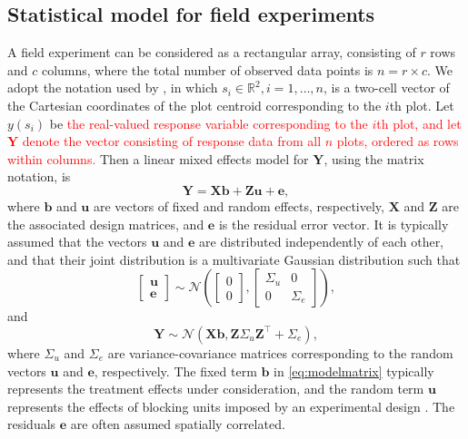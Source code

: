 \documentclass[a4paper]{article}   	%
\newcommand{\N}{\mathcal{N}}
\begin{document}
	\subsection{Statistical model for field experiments}\label{sec:fieldmodel}
	
	A field experiment can be considered as a rectangular array, consisting of $r$ rows and $c$ columns, where the total number of observed data points is $n= r\times c$. We adopt the notation used by \textcite{Zimmerman1991Randoma}, in which $s_i\in \mathbb{R}^2, i=1,\ldots,n$, is a two-cell vector of the Cartesian coordinates of the plot centroid corresponding to the $i$th plot. Let $y(s_i)$ be \textcolor{red}{the real-valued response variable corresponding to the $i$th plot, and let $\bm{Y}$ denote the vector consisting of response data from all $n$ plots, ordered as rows within columns.} Then a linear mixed effects model for $\bm{Y}$, using the matrix notation, is 
	\begin{equation}\label{eq:modelmatrix}
		\bm{Y} = \bm{X}\bm{b}+\bm{Z}\bm{u}+\bm{e},
	\end{equation}
	where $\bm{b}$ and $\bm{u}$ are vectors of fixed and random effects, respectively, $\bm{X}$ and $\bm{Z}$ are the associated design matrices, and $\bm{e}$ is the residual error vector. It is typically assumed that the vectors $\bm{u}$ and $\bm{e}$ are distributed independently of each other, and that their joint distribution is a multivariate Gaussian distribution such that
	\begin{equation}\label{eq:covariance}
		\begin{bmatrix}
			\bm{u} \\ \bm{e}
		\end{bmatrix} \sim \N\left( \begin{bmatrix}
			0\\0 \end{bmatrix}, \begin{bmatrix}
			\Sigma_u & 0 \\ 0 & \Sigma_e
		\end{bmatrix}\right),
	\end{equation}
	and 
	\begin{equation}\label{eq:distributionY}
		\bm{Y} \sim \N(\bm{X}\bm{b},\bm{Z}\Sigma_u\bm{Z}^\top+\Sigma_e),
	\end{equation}
	where $\Sigma_u$ and $\Sigma_e$ are variance-covariance matrices corresponding to the random vectors $\bm{u}$ and $\bm{e}$, respectively. The fixed term $\bm{b}$ in \eqref{eq:modelmatrix} typically represents the treatment effects under consideration, and the random term $\bm{u}$ represents the effects of blocking units imposed by an experimental design \parencite{piepho2003}. The residuals $\bm{e}$ are often assumed spatially correlated.
	
\end{document}

